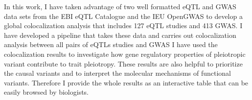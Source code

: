 In this work, I have taken advantage of two well formatted eQTL and GWAS data sets from the EBI eQTL Catalogue and the IEU OpenGWAS to develop a global colocalization analysis that includes 127 eQTL studies and 413 GWAS.
%
I have developed a pipeline that takes these data and carries out colocalization analysis between all pairs of eQTLs studies and GWAS
%
I have used the colocalization results to investigate how gene regulatory properties of pleiotropic variant contribute to trait pleiotropy.
%
These results are also helpful to prioritize the causal variants and to interpret the molecular mechanisms of functional variants.
%
Therefore I provide the whole results as an interactive table that can be easily browsed by biologists.